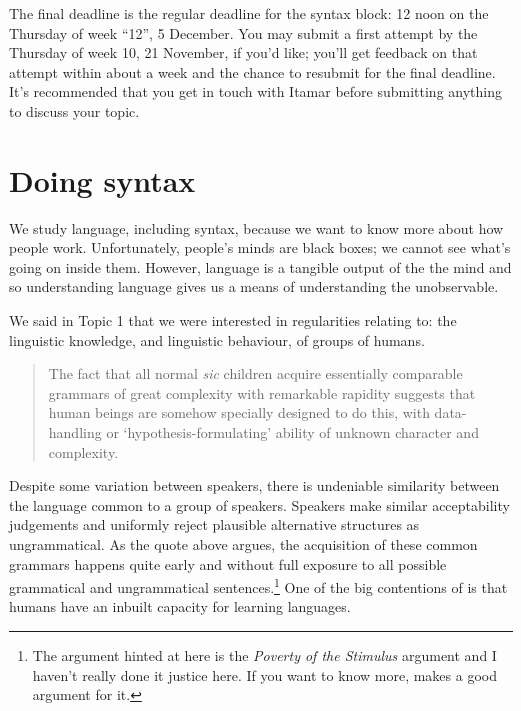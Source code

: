 \documentclass{article}
\begin{document}
The final deadline is the regular deadline for the syntax block: 12 noon on the Thursday of week ``12'', 5 December. You may submit a first attempt by the Thursday of week 10, 21 November, if you'd like; you'll get feedback on that attempt within about a week and the chance to resubmit for the final deadline. It's recommended that you get in touch with Itamar before submitting anything to discuss your topic.

\section{Doing syntax}
We study language, including syntax, because we want to know more about how people work.
Unfortunately, people's minds are black boxes; we cannot see what's going on inside them.
However, language is a tangible output of the the mind and so understanding language gives us a means of understanding the unobservable.

We said in Topic 1 that we were interested in regularities relating to: the linguistic knowledge, and linguistic behaviour, of groups of humans.
\begin{quote}
The fact that all normal \lbrack{}\emph{sic}\rbrack{} children acquire essentially comparable grammars of great complexity with remarkable rapidity suggests that human beings are somehow specially designed to do this, with data-handling or `hypothesis-formulating' ability of unknown character and complexity.
\end{quote}
Despite some variation between speakers, there is undeniable similarity between the language common to a group of speakers.
Speakers make similar acceptability judgements and uniformly reject plausible alternative structures as ungrammatical.
As the quote above argues, the acquisition of these common grammars happens quite early and without full exposure to all possible grammatical and ungrammatical sentences.\footnote{The argument hinted at here is the \emph{Poverty of the Stimulus} argument and I haven't really done it justice here.
If you want to know more,  makes a good argument for it.}
One of the big contentions of  is that humans have an inbuilt capacity for learning languages.
\end{document}
